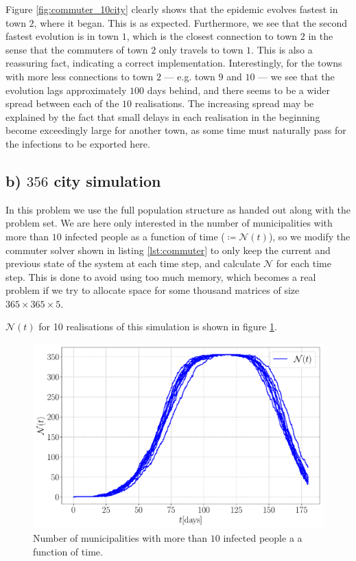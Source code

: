 Figure \ref{fig:commuter_10city} clearly shows that the epidemic evolves fastest in town $2$, where it began. This is as expected. Furthermore, we see that the second fastest evolution is in town $1$, which is the closest connection to town $2$ in the sense that the commuters of town $2$ only travels to town $1$. This is also a reassuring fact, indicating a correct implementation. Interestingly, for the towns with more less connections to town $2$ --- e.g. town $9$ and $10$ --- we see that the evolution lags approximately $100$ days behind, and there seems to be a wider spread between each of the $10$ realisations. The increasing spread may be explained by the fact that small delays in each realisation in the beginning become exceedingly large for another town, as some time must naturally pass for the infections to be exported here.

\subsection{b) $356$ city simulation}

In this problem we use the full population structure as handed out along with the problem set. We are here only interested in the number of municipalities with more than $10$ infected people as a function of time ($\coloneqq \mathcal{N}(t)$), so we modify the commuter solver shown in listing \ref{lst:commuter} to only keep the current and previous state of the system at each time step, and calculate $\mathcal{N}$ for each time step. This is done to avoid using too much memory, which becomes a real problem if we try to allocate space for some thousand matrices of size $365 \times 365 \times 5$. 

$\mathcal{N}(t)$ for 10 realisations of this simulation is shown in figure \ref{fig:infected_Eb}.  

\begin{figure}[htb]
	\centering
	\includegraphics[width=0.9\columnwidth]{../fig/2Eb_N_back.pdf}
	\caption{Number of municipalities with more than $10$ infected people a a function of time.}
	\label{fig:infected_Eb}
\end{figure}
